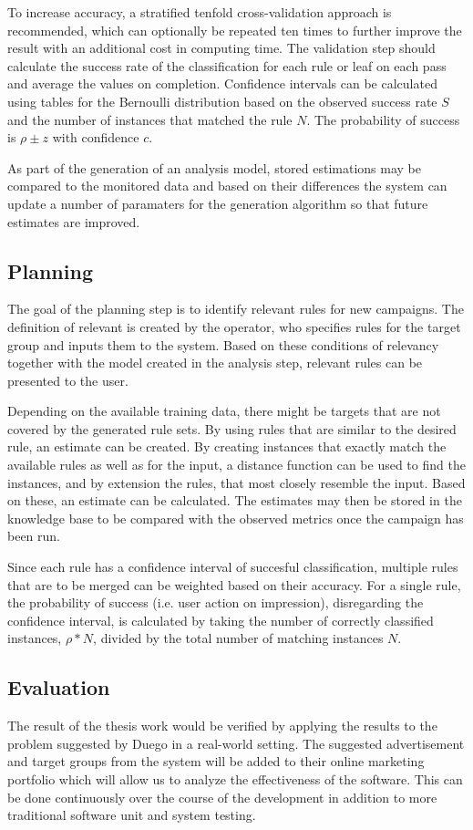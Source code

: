 \documentclass[10pt,twocolumn]{article}
\begin{document}
To increase accuracy, a stratified tenfold cross-validation approach is recommended, which can optionally be repeated ten times to further improve the result with an additional cost in computing time. The validation step should calculate the success rate of the classification for each rule or leaf on each pass and average the values on completion. Confidence intervals can be calculated using tables for the Bernoulli distribution \citep[chap. 5]{Witten2011} based on the observed success rate \(S\) and the number of instances that matched the rule \(N\). The probability of success is \(\rho \pm z\) with confidence \(c\).

As part of the generation of an analysis model, stored estimations may be compared to the monitored data and based on their differences the system can update a number of paramaters for the generation algorithm so that future estimates are improved.

\subsection{Planning}
The goal of the planning step is to identify relevant rules for new campaigns. The definition of relevant is created by the operator, who specifies rules for the target group and inputs them to the system. Based on these conditions of relevancy together with the model created in the analysis step, relevant rules can be presented to the user.

Depending on the available training data, there might be targets that are not covered by the generated rule sets. By using rules that are similar to the desired rule, an estimate can be created. By creating instances that exactly match the available rules as well as for the input, a distance function can be used to find the instances, and by extension the rules, that most closely resemble the input. Based on these, an estimate can be calculated. The estimates may then be stored in the knowledge base to be compared with the observed metrics once the campaign has been run.

Since each rule has a confidence interval of succesful classification, multiple rules that are to be merged can be weighted based on their accuracy. For a single rule, the probability of success (i.e. user action on impression), disregarding the confidence interval, is calculated by taking the number of correctly classified instances, \(\rho*N\), divided by the total number of matching instances \(N\).

\subsection{Evaluation}
The result of the thesis work would be verified by applying the results to the problem suggested by Duego in a real-world setting. The suggested advertisement and target groups from the system will be added to their online marketing portfolio which will allow us to analyze the effectiveness of the software. This can be done continuously over the course of the development in addition to more traditional software unit and system testing.
\end{document}
